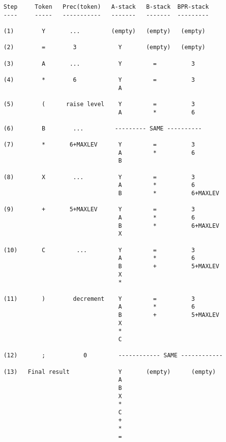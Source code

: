 \begin{verbatim}
 Step     Token   Prec(token)   A-stack   B-stack  BPR-stack
 ----     -----   -----------   -------   -------  ---------

 (1)        Y       ...         (empty)   (empty)   (empty)

 (2)        =        3            Y       (empty)   (empty)

 (3)        A       ...           Y         =          3

 (4)        *        6            Y         =          3
                                  A

 (5)        (      raise level    Y         =          3
                                  A         *          6

 (6)        B        ...         --------- SAME ----------

 (7)        *       6+MAXLEV      Y         =          3
                                  A         *          6
                                  B

 (8)        X        ...          Y         =          3
                                  A         *          6
                                  B         *          6+MAXLEV

 (9)        +       5+MAXLEV      Y         =          3
                                  A         *          6
                                  B         *          6+MAXLEV
                                  X

 (10)       C         ...         Y         =          3
                                  A         *          6
                                  B         +          5+MAXLEV
                                  X
                                  *

 (11)       )        decrement    Y         =          3
                                  A         *          6
                                  B         +          5+MAXLEV
                                  X
                                  *
                                  C
 
 (12)       ;           0         ------------ SAME ------------

 (13)   Final result              Y       (empty)      (empty)
                                  A
                                  B
                                  X
                                  *
                                  C
                                  +
                                  *
                                  =


\end{verbatim}

